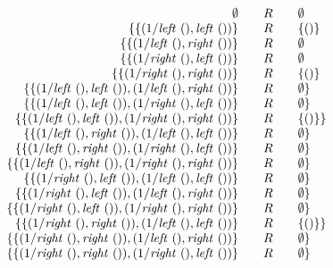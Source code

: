 \documentclass[preprint]{sigplanconf}
\begin{document}
\[\begin{array}{r@{\qquad}c@{\qquad}l}
\emptyset &R& \emptyset \\
\{ \{ (1/\mathit{left}~(),\mathit{left}~()) \} &R& \{ () \} \\
\{ \{ (1/\mathit{left}~(),\mathit{right}~()) \} &R& \emptyset \\
\{ \{ (1/\mathit{right}~(),\mathit{left}~()) \} &R& \emptyset \\
\{ \{ (1/\mathit{right}~(),\mathit{right}~()) \} &R& \{ () \} \\
\{ \{ (1/\mathit{left}~(),\mathit{left}~()), (1/\mathit{left}~(),\mathit{right}~()) \} &R&
  \emptyset \} \\
\{ \{ (1/\mathit{left}~(),\mathit{left}~()), (1/\mathit{right}~(),\mathit{left}~()) \} &R&
  \emptyset \} \\
\{ \{ (1/\mathit{left}~(),\mathit{left}~()), (1/\mathit{right}~(),\mathit{right}~()) \} &R&
  \{ () \} \} \\
\{ \{ (1/\mathit{left}~(),\mathit{right}~()), (1/\mathit{left}~(),\mathit{left}~()) \} &R&
  \emptyset \} \\
\{ \{ (1/\mathit{left}~(),\mathit{right}~()), (1/\mathit{right}~(),\mathit{left}~()) \} &R&
  \emptyset \} \\
\{ \{ (1/\mathit{left}~(),\mathit{right}~()), (1/\mathit{right}~(),\mathit{right}~()) \} &R&
  \emptyset \} \\
\{ \{ (1/\mathit{right}~(),\mathit{left}~()), (1/\mathit{left}~(),\mathit{left}~()) \} &R&
  \emptyset \} \\
\{ \{ (1/\mathit{right}~(),\mathit{left}~()), (1/\mathit{left}~(),\mathit{right}~()) \} &R&
  \emptyset \} \\
\{ \{ (1/\mathit{right}~(),\mathit{left}~()), (1/\mathit{right}~(),\mathit{right}~()) \} &R&
  \emptyset \} \\
\{ \{ (1/\mathit{right}~(),\mathit{right}~()), (1/\mathit{left}~(),\mathit{left}~()) \} &R&
  \{ () \} \} \\
\{ \{ (1/\mathit{right}~(),\mathit{right}~()), (1/\mathit{left}~(),\mathit{right}~()) \} &R&
  \emptyset \} \\
\{ \{ (1/\mathit{right}~(),\mathit{right}~()), (1/\mathit{right}~(),\mathit{left}~()) \} &R&
  \emptyset \} 
\end{array}\]
\end{document}
